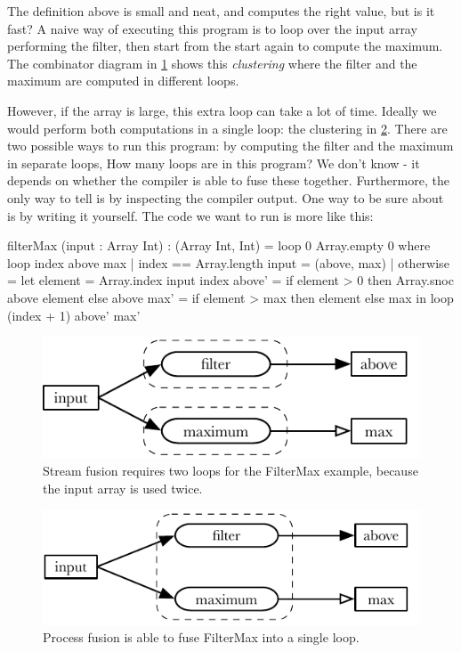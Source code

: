 The definition above is small and neat, and computes the right value, but is it fast?
A naive way of executing this program is to loop over the input array performing the filter, then start from the start again to compute the maximum.
The combinator diagram in \cref{fig:combinators:filtermax-stream} shows this \emph{clustering} where the filter and the maximum are computed in different loops.

However, if the array is large, this extra loop can take a lot of time.
Ideally we would perform both computations in a single loop: the clustering in \cref{fig:combinators:filtermax-fused}.
There are two possible ways to run this program: by computing the filter and the maximum in separate loops, 
How many loops are in this program? We don't know - it depends on whether the compiler is able to fuse these together.
Furthermore, the only way to tell is by inspecting the compiler output.
One way to be sure about is by writing it yourself.
The code we want to run is more like this:

\begin{code}
filterMax (input : Array Int) : (Array Int, Int)
 = loop 0 Array.empty 0
 where
  loop index above max
   | index == Array.length input
   = (above, max)
   | otherwise
   = let element = Array.index input index
         above'  = if element > 0
                   then Array.snoc above element
                   else above
         max'    = if element > max
                   then element
                   else max
     in  loop (index + 1) above' max'
\end{code}




\begin{figure}
\center
\includegraphics{figs/combinators/filtermax-stream.pdf}
\caption{Stream fusion requires two loops for the FilterMax example, because the input array is used twice.}
\label{fig:combinators:filtermax-stream}
\end{figure}

\begin{figure}
\center
\includegraphics{figs/combinators/filtermax-fused.pdf}
\caption{Process fusion is able to fuse FilterMax into a single loop.}
\label{fig:combinators:filtermax-fused}
\end{figure}


